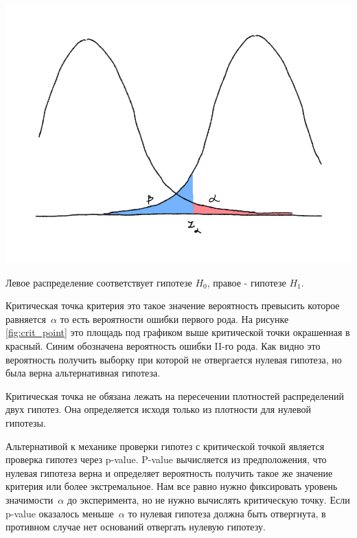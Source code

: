 \documentclass[../handbook.tex]{subfiles}
\begin{document}
\begin{marginfigure}
    \includegraphics[width=1.1\columnwidth]{pics/critical_points_mistakes_value.pdf}
    \caption{Левое распределение соответствует гипотезе $H_0$, правое - гипотезе $H_1$.}
    \label{fig:crit_point}
\end{marginfigure}
Критическая точка критерия это такое значение вероятность превысить которое
равняется~$\alpha$ то есть вероятности ошибки первого рода. На рисунке
\ref{fig:crit_point} это площадь под графиком выше критической точки окрашенная
в красный. Синим обозначена вероятность ошибки II-го рода. Как видно это
вероятность получить выборку при которой не отвергается нулевая гипотеза, но
была верна альтернативная гипотеза.

Критическая точка не обязана лежать на пересечении плотностей распределений
двух гипотез. Она определяется исходя только из плотности для нулевой гипотезы.

Альтернативой к механике проверки гипотез с критической точкой является
проверка гипотез через p-value. P-value вычисляется из предположения, что
нулевая гипотеза верна и определяет вероятность получить такое же значение
критерия или более экстремальное. Нам все равно нужно фиксировать уровень
значимости~$\alpha$ до эксперимента, но не нужно вычислять критическую точку.
Если p-value оказалось меньше~$\alpha$ то нулевая гипотеза должна быть
отвергнута, в противном случае нет оснований отвергать нулевую гипотезу.
\end{document}
